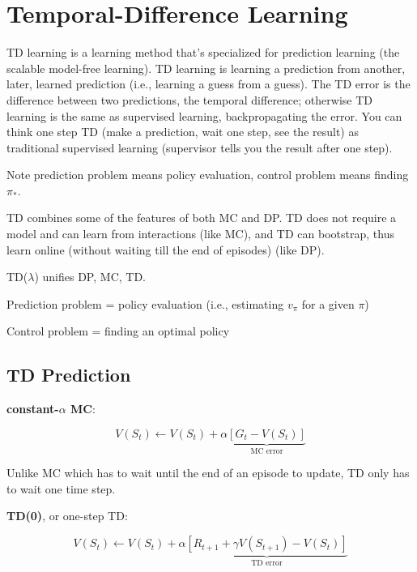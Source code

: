 \documentclass[sutton_barto_notes.tex]{subfiles}
\begin{document}
\newpage
\section{Temporal-Difference Learning}

TD learning is a learning method that's specialized for prediction learning (the scalable model-free learning). TD learning is learning a prediction from another, later, learned prediction (i.e., learning a guess from a guess).
The TD error is the difference between two predictions, the temporal difference; otherwise TD learning is the same as supervised learning, backpropagating the error.
You can think one step TD (make a prediction, wait one step, see the result) as traditional supervised learning (supervisor tells you the result after one step).

Note prediction problem means policy evaluation, control problem means finding $\pi_*$.

TD combines some of the features of both MC and DP. TD does not require a model and can learn from interactions (like MC), and TD can bootstrap, thus learn online (without waiting till the end of episodes) (like DP).

TD($\lambda$) unifies DP, MC, TD.

Prediction problem = policy evaluation (i.e., estimating $v_\pi$ for a given $\pi$)

Control problem = finding an optimal policy

\subsection{TD Prediction}

\begin{definition}
\textbf{constant-$\alpha$ MC}:

$$V(S_t) \leftarrow V(S_t) + \alpha \underbrace{[G_t - V(S_t)]}_\text{MC error} $$
\end{definition}

Unlike MC which has to wait until the end of an episode to update, TD only has to wait one time step.

\begin{definition}
\textbf{TD(0)}, or one-step TD:

$$ V(S_t) \leftarrow V(S_t) + \alpha \underbrace{[R_{t+1} + \gamma V(S_{t+1}) - V(S_t)]}_\text{TD error}$$
\end{definition}
\end{document}
